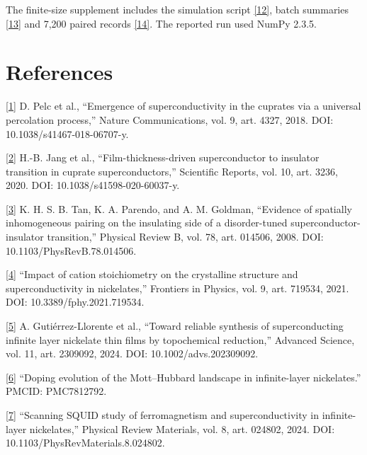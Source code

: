 \documentclass[11pt]{article}
\begin{document}
The finite-size supplement includes the simulation script \href{https://github.com/tejasvswipe/superconductvity-nickelate-research/blob/17a8b7f801d3c105c6ebfdf49bf1fe5b6fae62b0/finite_size_control.py}{[12]}, batch summaries \href{https://github.com/tejasvswipe/superconductvity-nickelate-research/blob/17a8b7f801d3c105c6ebfdf49bf1fe5b6fae62b0/finite_size_results/summary.csv}{[13]} and 7,200 paired records \href{https://github.com/tejasvswipe/superconductvity-nickelate-research/blob/17a8b7f801d3c105c6ebfdf49bf1fe5b6fae62b0/finite_size_results/maps.csv}{[14]}. The reported run used NumPy 2.3.5.

\section*{References}

\href{https://doi.org/10.1038/s41467-018-06707-y}{[1]} D. Pelc et al., “Emergence of superconductivity in the cuprates via a universal percolation process,” Nature Communications, vol. 9, art. 4327, 2018. DOI: 10.1038/s41467-018-06707-y.

\href{https://doi.org/10.1038/s41598-020-60037-y}{[2]} H.-B. Jang et al., “Film-thickness-driven superconductor to insulator transition in cuprate superconductors,” Scientific Reports, vol. 10, art. 3236, 2020. DOI: 10.1038/s41598-020-60037-y.

\href{https://doi.org/10.1103/PhysRevB.78.014506}{[3]} K. H. S. B. Tan, K. A. Parendo, and A. M. Goldman, “Evidence of spatially inhomogeneous pairing on the insulating side of a disorder-tuned superconductor-insulator transition,” Physical Review B, vol. 78, art. 014506, 2008. DOI: 10.1103/PhysRevB.78.014506.

\href{https://doi.org/10.3389/fphy.2021.719534}{[4]} “Impact of cation stoichiometry on the crystalline structure and superconductivity in nickelates,” Frontiers in Physics, vol. 9, art. 719534, 2021. DOI: 10.3389/fphy.2021.719534.

\href{https://doi.org/10.1002/advs.202309092}{[5]} A. Gutiérrez-Llorente et al., “Toward reliable synthesis of superconducting infinite layer nickelate thin films by topochemical reduction,” Advanced Science, vol. 11, art. 2309092, 2024. DOI: 10.1002/advs.202309092.

\href{https://pmc.ncbi.nlm.nih.gov/articles/PMC7812792/}{[6]} “Doping evolution of the Mott–Hubbard landscape in infinite-layer nickelates.” PMCID: PMC7812792.

\href{https://doi.org/10.1103/PhysRevMaterials.8.024802}{[7]} “Scanning SQUID study of ferromagnetism and superconductivity in infinite-layer nickelates,” Physical Review Materials, vol. 8, art. 024802, 2024. DOI: 10.1103/PhysRevMaterials.8.024802.
\end{document}
